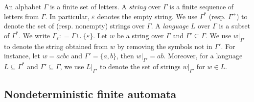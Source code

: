%


An alphabet $\Gamma$ is a finite set of letters.  A \emph{string} over $\Gamma$ is a finite sequence of letters from $\Gamma$. In particular, $\varepsilon$ denotes %
the empty string. We use $\Gamma^*$ (resp. $\Gamma^+$) to denote the set of (resp. nonempty) strings over $\Gamma$. A \emph{language} $L$ over $\Gamma$ is a  subset of $\Gamma^*$. We write $\Gamma_\varepsilon: = \Gamma \cup \{\varepsilon\}$. Let $w$ be a string over $\Gamma$ and $\Gamma' \subseteq \Gamma$. We use $w |_{\Gamma'}$ to denote the string obtained from $w$ by removing the symbols not in $\Gamma'$. For instance, let $w = a  c b c$ and $\Gamma' = \{a,b\}$, then $w|_{\Gamma'} = ab$. Moreover, for a language $L \subseteq \Gamma^*$ and $\Gamma' \subseteq \Gamma$, we use $L|_{\Gamma'}$ to denote the set of strings $w |_{\Gamma'}$ for $w \in L$. 
 
\subsection{Nondeterministic finite automata}


